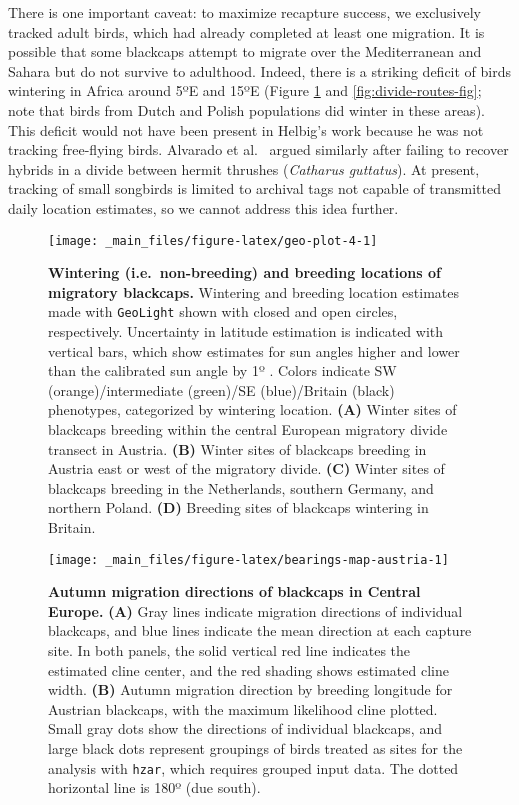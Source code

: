 \documentclass[a4paper, nobind]{templates/ociamthesis}
\begin{document}
There is one important caveat: to maximize recapture success, we exclusively tracked adult birds, which had already completed at least one migration. It is possible that some blackcaps attempt to migrate over the Mediterranean and Sahara but do not survive to adulthood. Indeed, there is a striking deficit of birds wintering in Africa around 5ºE and 15ºE (Figure \ref{fig:geo-plot-4} and \ref{fig:divide-routes-fig}; note that birds from Dutch and Polish populations did winter in these areas). This deficit would not have been present in Helbig's work because he was not tracking free-flying birds. Alvarado et al.~\autocite*{alvaradoIntegrativeTrackingMethods2014} argued similarly after failing to recover hybrids in a divide between hermit thrushes (\emph{Catharus guttatus}). At present, tracking of small songbirds is limited to archival tags not capable of transmitted daily location estimates, so we cannot address this idea further.



\begin{figure}
\texttt{[image: \_main\_files/figure-latex/geo-plot-4-1]} \caption{\textbf{Wintering (i.e.~non-breeding) and breeding locations of migratory blackcaps.} Wintering and breeding location estimates made with \texttt{GeoLight} shown with closed and open circles, respectively. Uncertainty in latitude estimation is indicated with vertical bars, which show estimates for sun angles higher and lower than the calibrated sun angle by 1º \autocite[following][]{hiemerFirstTracksIndividual2018}. Colors indicate SW (orange)/intermediate (green)/SE (blue)/Britain (black) phenotypes, categorized by wintering location. \textbf{(A)} Winter sites of blackcaps breeding within the central European migratory divide transect in Austria. \textbf{(B)} Winter sites of blackcaps breeding in Austria east or west of the migratory divide. \textbf{(C)} Winter sites of blackcaps breeding in the Netherlands, southern Germany, and northern Poland. \textbf{(D)} Breeding sites of blackcaps wintering in Britain.}\label{fig:geo-plot-4}
\end{figure}



\begin{figure}
\texttt{[image: \_main\_files/figure-latex/bearings-map-austria-1]} \caption{\textbf{Autumn migration directions of blackcaps in Central Europe.} \textbf{(A)} Gray lines indicate migration directions of individual blackcaps, and blue lines indicate the mean direction at each capture site. In both panels, the solid vertical red line indicates the estimated cline center, and the red shading shows estimated cline width. \textbf{(B)} Autumn migration direction by breeding longitude for Austrian blackcaps, with the maximum likelihood cline plotted. Small gray dots show the directions of individual blackcaps, and large black dots represent groupings of birds treated as sites for the analysis with \texttt{hzar}, which requires grouped input data. The dotted horizontal line is 180º (due south).}\label{fig:bearings-map-austria}
\end{figure}
\end{document}
